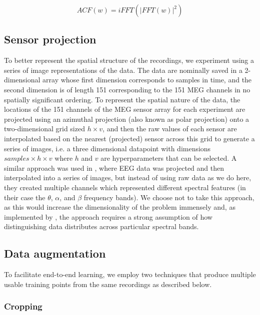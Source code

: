 \documentclass[utf8]{frontiersSCNS} %
\begin{document}

\begin{equation}
  ACF(w) = iFFT(|FFT(w)|^2)
  \label{eq1}
\end{equation}

\subsection{Sensor projection}\label{sec:sens_proj}

To better represent the spatial structure of the recordings, we experiment using a series of image representations of the data. The data are nominally saved in a 2-dimensional array whose first dimension corresponds to samples in time, and the second dimension is of length 151 corresponding to the 151 MEG channels in no spatially significant ordering. To represent the spatial nature of the data, the locations of the 151 channels of the MEG sensor array for each experiment are projected using an azimuthal projection (also known as polar projection) onto a two-dimensional grid sized $h \times v$, and then the raw values of each sensor are  interpolated based on the nearest (projected) sensor across this grid to generate a series of images, i.e. a three dimensional datapoint with dimensions $samples \times  h \times v$ where $h$ and $v$ are hyperparameters that can be selected. A similar approach was used in \cite{Bashivan2016}, where EEG data was projected and then interpolated into a series of images, but instead of using raw data as we do here, they created multiple channels which represented different spectral features (in their case the $\theta$, $\alpha$, and $\beta$ frequency bands). We choose not to take this approach, as this would increase the dimensionality of the problem immensely and, as implemented by \cite{Bashivan2016}, the approach requires a strong assumption of how distinguishing data distributes across particular spectral bands.

\subsection{Data augmentation}

To facilitate end-to-end learning, we employ two techniques that produce multiple usable training points from the same recordings as described below. 

\subsubsection{Cropping}
\end{document}
